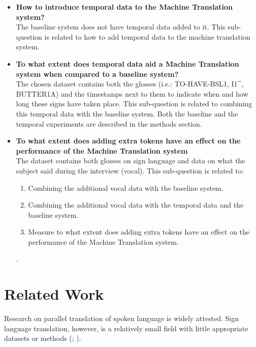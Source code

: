 \begin{itemize}
    \item \textbf{How to introduce temporal data to the Machine Translation system?} \\
    The baseline system does not have temporal data added to it. This sub-question is related to how to add temporal data to the machine translation system.
    \item \textbf{To what extent does temporal data aid a Machine Translation system when compared to a baseline system?} \\
    The chosen dataset \cite{dgscorpus_3} contains both the glosses (i.e.: TO-HAVE-BSL1, I1\textasciicircum, BUTTER1A) and the timestamps next to them to indicate when and how long these signs have taken place. This sub-question is related to combining this temporal data with the baseline system. Both the baseline and the temporal experiments are described in the methods section.
    \item \textbf{To what extent does adding extra tokens have an effect on the performance of the Machine Translation system} \\
    The dataset contains both glosses on sign language and data on what the subject said during the interview (vocal). This sub-question is related to:
    \begin{enumerate}
        \item Combining the additional vocal data with the baseline system.
        \item Combining the additional vocal data with the temporal data and the baseline system.
        \item Measure to what extent does adding extra tokens have an effect on the performance of the Machine Translation system.
    \end{enumerate}.
\end{itemize}

\section{Related Work}

Research on parallel translation of spoken language is widely attested. Sign language translation, however, is a relatively small field with little appropriate datasets or methods (\citealp{camgoz2021content4all}; \citealp{bragg2019sign}).

